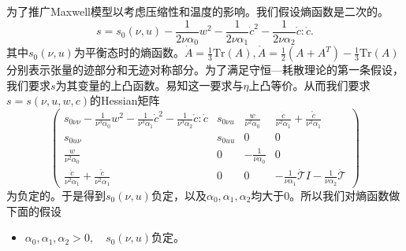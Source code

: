 
	为了推广Maxwell模型以考虑压缩性和温度的影响。我们假设熵函数是二次的。
	\begin{equation}\label{eq:entropyf}
		s = s_0(\nu,u)  - \frac{1}{2\nu \alpha_0} w^2 - \frac{1}{2\nu \alpha_1} \dot{c}^2- \frac{1}{2\nu\alpha_2 } \mathring{c}:\mathring{c}.
	\end{equation}
	其中$s_0(\nu,u)$为平衡态时的熵函数。$\dot{A} = \frac{1}{3} \mbox{Tr} (A), \mathring{A} = \frac{1}{2} (A + A^T) - \frac{1}{3} \mbox{Tr} (A) $分别表示张量的迹部分和无迹对称部分。为了满足守恒—耗散理论的第一条假设，我们要求$s$为其变量的上凸函数。易知这一要求与$\eta$上凸等价。从而我们要求$s=s(\nu,u,w,c)$的Hessian矩阵
	\begin{equation*}
		\left(    \begin{array}{cccc}
			s_{0\nu\nu} - \frac{1}{\nu^3 \alpha_0} w^2 - \frac{1}{\nu^3 \alpha_1} \dot{c}^2- \frac{1}{\nu^3 \alpha_2} \mathring{c}:\mathring{c} & s_{0\nu u} & \frac{w}{\nu^2 \alpha_0} & \frac{\dot{c}}{\nu^2 \alpha_1} + \frac{\mathring{c}}{\nu^2 \alpha_1} \\
			s_{0u\nu} & s_{0uu} & 0 & 0 \\
			\frac{w}{\nu^2\alpha_0} & 0 & -\frac{1}{\nu \alpha_0} & 0 \\
			\frac{\dot{c}}{\nu^2 \alpha_1} + \frac{\mathring{c}}{\nu^2 \alpha_1} & 0 & 0 & -\frac{1}{\nu \alpha_1} \dot{\mathcal{T}} I -\frac{1}{\nu \alpha_2} \mathring{\mathcal{T}} 
		\end{array} \right)
	\end{equation*}
	为负定的。于是得到$s_0(\nu,u)$负定，以及$\alpha_0,\alpha_1,\alpha_2$均大于$0$。所以我们对熵函数做下面的假设
	\begin{itemize}
		\item $\alpha_0,\alpha_1,\alpha_2>0, \quad s_0(\nu,u) \text{负定。}$
	\end{itemize}

